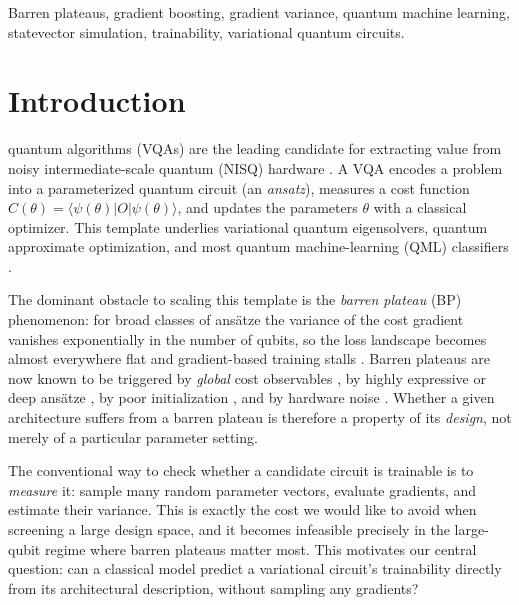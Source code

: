 \documentclass{ieeeaccess}
\begin{document}
\begin{keywords}
Barren plateaus, gradient boosting, gradient variance, quantum machine learning,
statevector simulation, trainability, variational quantum circuits.
\end{keywords}

\titlepgskip=-21pt

\maketitle

\section{Introduction}
\label{sec:introduction}
 quantum algorithms (VQAs) are the leading candidate for
extracting value from noisy intermediate-scale quantum (NISQ) hardware
\cite{cerezo2021vqa}. A VQA encodes a problem into a parameterized quantum circuit
(an \emph{ansatz}), measures a cost function
$C(\theta)=\langle\psi(\theta)|O|\psi(\theta)\rangle$, and updates the parameters
$\theta$ with a classical optimizer. This template underlies variational quantum
eigensolvers, quantum approximate optimization, and most quantum machine-learning
(QML) classifiers \cite{havlicek2019supervised,farhi2018classification,schuld2020circuit}.

The dominant obstacle to scaling this template is the \emph{barren plateau} (BP)
phenomenon: for broad classes of ans\"atze the variance of the cost gradient
vanishes exponentially in the number of qubits, so the loss landscape becomes
almost everywhere flat and gradient-based training stalls
\cite{mcclean2018barren,larocca2025barren}. Barren plateaus are now known to be
triggered by \emph{global} cost observables \cite{cerezo2021cost}, by highly
expressive or deep ans\"atze \cite{holmes2022expressibility}, by poor
initialization \cite{grant2019initialization}, and by hardware noise
\cite{wang2021noise}. Whether a given architecture suffers from a barren plateau is
therefore a property of its \emph{design}, not merely of a particular parameter
setting.

The conventional way to check whether a candidate circuit is trainable is to
\emph{measure} it: sample many random parameter vectors, evaluate gradients, and
estimate their variance. This is exactly the cost we would like to avoid when
screening a large design space, and it becomes infeasible precisely in the
large-qubit regime where barren plateaus matter most. This motivates our central
question: can a classical model predict a variational circuit's trainability
directly from its architectural description, without sampling any gradients?
\end{document}
